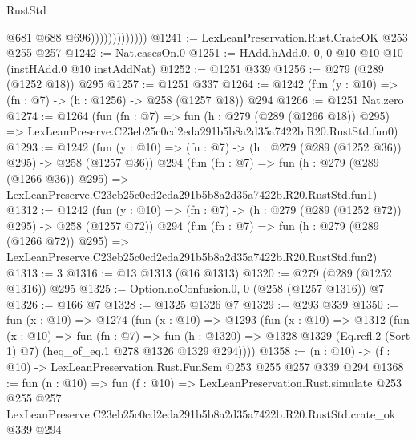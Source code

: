 \begin{lexlean}{RustStd}
\begin{coremodule}
                              @681
                              @688
                              @696)))))))))))))
@1241 := LexLeanPreservation.Rust.CrateOK @253 @255 @257
@1242 := Nat.casesOn.{0}
@1251 := HAdd.hAdd.{0, 0, 0} @10 @10 @10 (instHAdd.{0} @10 instAddNat)
@1252 := @1251 @339
@1256 := @279 (@289 (@1252 @18)) @295
@1257 := @1251 @337
@1264 := @1242 (fun (y : @10) => (fn : @7) -> (h : @1256) -> @258 (@1257 @18)) @294
@1266 := @1251 Nat.zero
@1274 := @1264
    (fun (fn : @7) =>
    fun (h : @279 (@289 (@1266 @18)) @295) =>
    LexLeanPreserve.C23eb25c0cd2eda291b5b8a2d35a7422b.R20.RustStd.fun0)
@1293 := @1242
    (fun (y : @10) => (fn : @7) -> (h : @279 (@289 (@1252 @36)) @295) -> @258 (@1257 @36))
    @294
    (fun (fn : @7) =>
    fun (h : @279 (@289 (@1266 @36)) @295) =>
    LexLeanPreserve.C23eb25c0cd2eda291b5b8a2d35a7422b.R20.RustStd.fun1)
@1312 := @1242
    (fun (y : @10) => (fn : @7) -> (h : @279 (@289 (@1252 @72)) @295) -> @258 (@1257 @72))
    @294
    (fun (fn : @7) =>
    fun (h : @279 (@289 (@1266 @72)) @295) =>
    LexLeanPreserve.C23eb25c0cd2eda291b5b8a2d35a7422b.R20.RustStd.fun2)
@1313 := 3
@1316 := @13 @1313 (@16 @1313)
@1320 := @279 (@289 (@1252 @1316)) @295
@1325 := Option.noConfusion.{0, 0} (@258 (@1257 @1316)) @7
@1326 := @166 @7
@1328 := @1325 @1326 @7
@1329 := @293 @339
@1350 := fun (x : @10) =>
  @1274
    (fun (x : @10) =>
    @1293
      (fun (x : @10) =>
      @1312
        (fun (x : @10) =>
        fun (fn : @7) =>
        fun (h : @1320) =>
        @1328 @1329 (Eq.refl.{2} (Sort 1) @7) (heq_of_eq.{1} @278 @1326 @1329 @294))))
@1358 := (n : @10) -> (f : @10) -> LexLeanPreservation.Rust.FunSem @253 @255 @257 @339 @294
@1368 := fun (n : @10) =>
  fun (f : @10) =>
  LexLeanPreservation.Rust.simulate
    @253
    @255
    @257
    LexLeanPreserve.C23eb25c0cd2eda291b5b8a2d35a7422b.R20.RustStd.crate_ok
    @339
    @294
\end{coremodule}
\end{lexlean}
